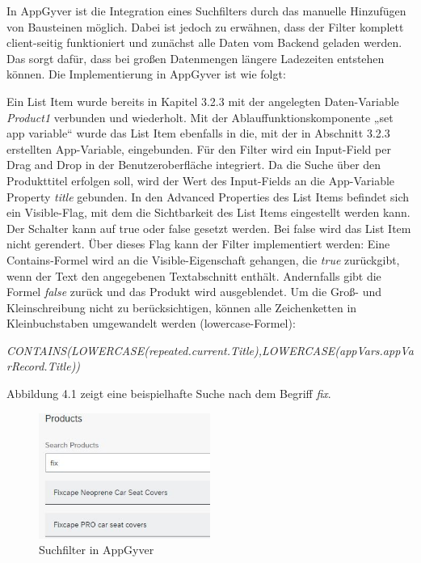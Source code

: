 In AppGyver ist die Integration eines Suchfilters durch das manuelle Hinzufügen von Bausteinen möglich. Dabei ist jedoch zu erwähnen, dass der Filter komplett client-seitig funktioniert und zunächst alle Daten vom Backend geladen werden. Das sorgt dafür, dass bei großen Datenmengen längere Ladezeiten entstehen können. Die Implementierung in AppGyver ist wie folgt:

Ein List Item wurde bereits in Kapitel 3.2.3 mit der angelegten Daten-Variable \textit{Product1} verbunden und wiederholt. Mit der Ablauffunktionskomponente „set app variable“ wurde das List Item ebenfalls in die, mit der in Abschnitt 3.2.3 erstellten App-Variable, eingebunden. Für den Filter wird ein Input-Field per Drag and Drop in der Benutzeroberfläche integriert. Da die Suche über den Produkttitel erfolgen soll, wird der Wert des Input-Fields an die App-Variable Property \textit{title} gebunden. In den Advanced Properties des List Items befindet sich ein Visible-Flag, mit dem die Sichtbarkeit des List Items eingestellt werden kann. Der Schalter kann auf true oder false gesetzt werden. Bei false wird das List Item nicht gerendert. Über dieses Flag kann der Filter implementiert werden: Eine Contains-Formel wird an die Visible-Eigenschaft gehangen, die \textit{true} zurückgibt, wenn der Text den angegebenen Textabschnitt enthält. Andernfalls gibt die Formel \textit{false} zurück und das Produkt wird ausgeblendet. Um die Groß- und Kleinschreibung nicht zu berücksichtigen, können alle Zeichenketten in Kleinbuchstaben umgewandelt werden (lowercase-Formel):

\textit{\scriptsize CONTAINS(LOWERCASE(repeated.current.Title),LOWERCASE(appVars.appVarRecord.Title))}


Abbildung 4.1 zeigt eine beispielhafte  Suche nach dem Begriff \textit{fix}.
\begin{figure}[htbp]
 \centering
 \includegraphics[width=0.5\textwidth]{Bilder/appgyver/4_1_Suchfilter_in_AppGyver.jpg}
 \caption{Suchfilter in AppGyver}
\end{figure}

